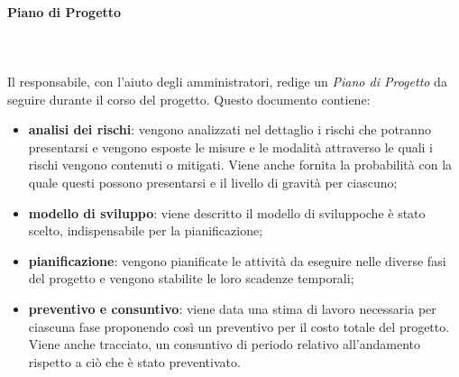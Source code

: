 \paragraph{Piano di Progetto} \mbox{}\\ \mbox{}\\
Il responsabile, con l'aiuto degli amministratori, redige un \textit{Piano di 
Progetto} da seguire durante il corso del progetto. Questo documento contiene:
	\begin{itemize}
		\item \textbf{analisi dei rischi}: vengono analizzati nel dettaglio i rischi 
			che potranno presentarsi e vengono esposte le misure e le modalità attraverso le 
			quali i rischi vengono contenuti o mitigati. Viene anche fornita la probabilità 
			con la quale questi possono presentarsi e il livello di gravità per ciascuno;
		\item \textbf{modello di sviluppo\glo}: viene descritto il modello di 
			sviluppo\glosp che è stato scelto, indispensabile per la pianificazione;
		\item \textbf{pianificazione}: vengono pianificate le attività da eseguire 
			nelle diverse fasi del progetto e vengono stabilite le loro scadenze temporali;
		\item \textbf{preventivo e consuntivo}: viene data una stima di lavoro 
			necessaria per ciascuna fase proponendo così un preventivo per il costo totale 
			del progetto. Viene anche tracciato, un consuntivo di periodo relativo 
			all'andamento rispetto a ciò che è stato preventivato.
	\end{itemize}
		
